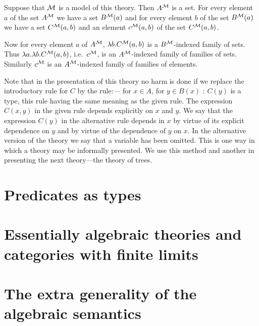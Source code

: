 Suppose that $\mathcal{M}$ is a model of this theory.
%
Then $A^{\mathcal{M}}$ is a set.
%
For every element $a$ of the set $A^{\mathcal{M}}$ we have a set $B^{\mathcal{M}}(a)$ and for every element $b$ of the set $B^{\mathcal{M}}(a)$ we have a set $C^{\mathcal{M}}(a,b)$ and an element $c^{\mathcal{M}}(a,b)$ of the set $C^{\mathcal{M}}(a,b)$.

\begin{figure}
\end{figure}

Now for every element $a$ of $A^{\mathcal{M}}$, $\lambda b.C^{\mathcal{M}}(a,b)$ is a $B^{\mathcal{M}}$-indexed family of sets.
%
Thus $\lambda a. \lambda b. C^{\mathcal{M}}(a,b)$, i.e.\ $c^{\mathcal{M}}$, is an $A^{\mathcal{M}}$-indexed family of families of sets.
%
Similarly $c^{\mathcal{M}}$ is an $A^{\mathcal{M}}$-indexed family of families of elements.

Note that in the presentation of this theory no harm is done if we replace the introductory rule for $C$ by the  rule:--- for $x \in A$, for $y \in B(x)$ : $C(y)$ is a type, this rule having the same meaning as the given rule.
%
The expression $C(x,y)$ in the given rule depends explicitly on $x$ and $y$.
%
We say that the expression $C(y)$ in the alternative rule depends  in $x$ by virtue of its explicit dependence on $y$ and by virtue of the dependence of $y$ on $x$.
%
In the alternative version of the theory we say that a variable has been omitted.
%
This is one way in which a theory may be informally presented.
%
We use this method and another in presenting the next theory---the theory of trees.



\section{Predicates as types} \label{sec:source-1-3}

\lipsum[2]

\section{Essentially algebraic theories and categories with finite limits} \label{sec:source-1-4}

\lipsum[3]

\section{The extra generality of the algebraic semantics} \label{sec:source-1-5}

